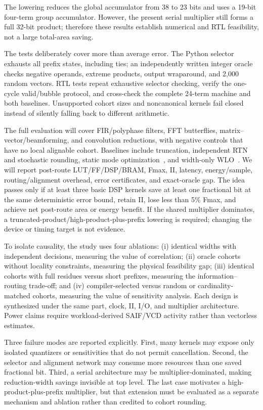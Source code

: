 \documentclass[conference]{IEEEtran}
\begin{document}
The lowering reduces the global accumulator from 38 to 23 bits and uses a
19-bit four-term group accumulator. However, the present serial multiplier
still forms a full 32-bit product; therefore these results establish numerical
and RTL feasibility, not a large total-area saving.

The tests deliberately cover more than average error. The Python selector
exhausts all prefix states, including ties; an independently written integer
oracle checks negative operands, extreme products, output wraparound, and 2,000
random vectors. RTL tests repeat exhaustive selector checking, verify the
one-cycle valid/bubble protocol, and cross-check the complete 24-term machine
and both baselines. Unsupported cohort sizes and noncanonical kernels fail
closed instead of silently falling back to different arithmetic.

The full evaluation will cover FIR/polyphase filters, FFT butterflies,
matrix--vector/beamforming, and convolution reductions, with negative controls
that have no local alignable cohort. Baselines include truncation, independent
RTN and stochastic rounding, static mode optimization~\cite{menard2010}, and
width-only WLO~\cite{winandy2025}. We will report post-route LUT/FF/DSP/BRAM,
Fmax, II, latency, energy/sample, routing/alignment overhead, error certificates,
and exact-oracle gap. The idea passes only if at least three basic DSP kernels
save at least one fractional bit at the same deterministic error bound, retain
II, lose less than 5\% Fmax, and achieve net post-route area or energy benefit.
If the shared multiplier dominates, a truncated-product/high-product-plus-prefix
lowering is required; changing the device or timing target is not evidence.

To isolate causality, the study uses four ablations: (i) identical widths with
independent decisions, measuring the value of correlation; (ii) oracle cohorts
without locality constraints, measuring the physical feasibility gap; (iii)
identical cohorts with full residues versus short prefixes, measuring the
information--routing trade-off; and (iv) compiler-selected versus random or
cardinality-matched cohorts, measuring the value of sensitivity analysis. Each
design is synthesized under the same part, clock, II, I/O, and multiplier
architecture. Power claims require workload-derived SAIF/VCD activity rather
than vectorless estimates.

Three failure modes are reported explicitly. First, many kernels may expose
only isolated quantizers or sensitivities that do not permit cancellation.
Second, the selector and alignment network may consume more resources than one
saved fractional bit. Third, a serial architecture may be multiplier-dominated,
making reduction-width savings invisible at top level. The last case motivates
a high-product-plus-prefix multiplier, but that extension must be evaluated as
a separate mechanism and ablation rather than credited to cohort rounding.
\end{document}
